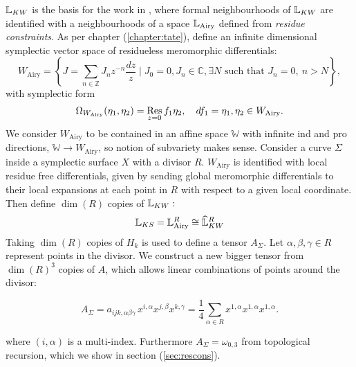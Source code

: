     \( \mathbb{L}_{KW}\) is the basis for the work in \cite{ks_airy}, where formal neighbourhoods of \( \mathbb{L}_{KW} \) are identified with a neighbourhoods of a space \( \mathbb{L}_{\mathrm{Airy}}\) defined from \emph{residue constraints}. As per chapter (\ref{chapter:tate}), define an infinite dimensional  symplectic vector space of residueless meromorphic differentials:
    \begin{equation}  
    \label{wairy}
        W_{\mathrm{Airy}}=\left\{ J=\sum_{n\in\mathbb{Z}} J_nz^{-n}\frac{dz}{z}\mid J_0=0, J_n \in \mathbb{C}, \exists N \text{ such that }J_n=0,\ n>N\right\},
    \end{equation} 
    with symplectic form
    \[ \Omega_{W_{\mathrm{Airy}}}(\eta_1,\eta_2)=\operatorname*{Res}_{z=0}f_1\eta_2,\quad df_1=\eta_1,\eta_2\in W_{\mathrm{Airy}}.\]
    We consider \( W_{\mathrm{Airy}} \) to be contained in an affine space \( \mathbb{W}\) with infinite ind and pro directions, \(\mathbb{W} \rightarrow W_{\mathrm{Airy}}   \), so notion of subvariety makes sense. Consider a curve \( \Sigma\) inside a symplectic surface \(X\) with a divisor \(R\).  \(W_{\text{Airy}}\) is identified with local residue free differentials, given by sending global meromorphic differentials to their local expansions at each point in \(R\) with respect to a given local coordinate.
    Then define \( \dim(R)\) copies of \( \mathbb{L}_{KW}:\)
    \[ \mathbb{L}_{KS}=\mathbb{L}_{\mathrm{Airy}}^R \cong \widehat{\mathbb{L}}_{KW}^R \]
    Taking \(\dim(R)\) copies of \(H_k\) is used to define a tensor \(A_\Sigma\).  Let \( \alpha , \beta, \gamma \in R \) represent points in the divisor. We construct a new bigger tensor from \(\dim(R)^3\) copies of \(A\), which allows linear combinations of points around the divisor:
    \begin{defn}
    \label{defn:Asigma}
    \[ A_\Sigma = a_{ijk,\alpha \beta \gamma} \, x^{i,\alpha} x^{j,\beta} x^{k,\gamma} = \frac{1}{4} \sum_{\alpha \in R} x^{1,\alpha} x^{1,\alpha} x^{1,\alpha}.  \]
    \end{defn}
    where \( (i,\alpha)\) is a multi-index. Furthermore \( A_\Sigma = \omega_{0,3}\) from topological recursion, which we show in section (\ref{sec:rescons}).
    
    
